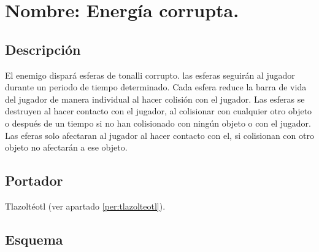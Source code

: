 \section{Nombre: Energía corrupta.} \label{hab.CorrupEner}
\subsection{Descripción}
El enemigo dispará esferas de tonalli corrupto. las esferas seguirán al jugador durante un periodo de tiempo determinado. Cada esfera reduce la barra de vida del jugador de manera individual al hacer colisión con el jugador. Las esferas se destruyen al hacer contacto con el jugador, al colisionar con cualquier otro objeto o después de un tiempo si no han colisionado con ningún objeto o con el jugador. Las eferas solo afectaran al jugador al hacer contacto con el, si colisionan con otro objeto no afectarán a ese objeto. 
\subsection{Portador}
Tlazoltéotl (ver apartado \ref{per:tlazolteotl}).
\subsection{Esquema}
			